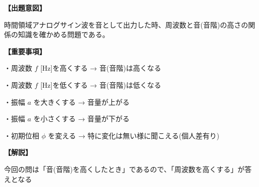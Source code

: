 \noindent \textbf{【出題意図】}

\noindent 時間領域アナログサイン波を音として出力した時、周波数と音(音階)の高さの関係の知識を確かめる問題である。

\vspace{1em}
\noindent \textbf{【重要事項】}

\medskip
\noindent ・周波数 $f$ [Hz]を高くする → 音(音階)は高くなる

\medskip
\noindent ・周波数 $f$ [Hz]を低くする → 音(音階)は低くなる

\medskip
\noindent ・振幅 $a$ を大きくする → 音量が上がる

\medskip
\noindent ・振幅 $a$ を小さくする → 音量が下がる

\medskip
\noindent ・初期位相 $\phi$ を変える → 特に変化は無い様に聞こえる(個人差有り)

\vspace{1em}
\noindent \textbf{【解説】}

\noindent 今回の問は「音(音階)を高くしたとき」であるので、「周波数を高くする」が答えとなる
